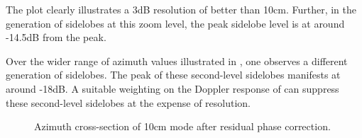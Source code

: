 The plot clearly illustrates a 3dB resolution of better than 10cm. Further, in the generation of sidelobes at this zoom level, the peak sidelobe level is at around -14.5dB from the peak.
\par
Over the wider range of azimuth values illustrated in , one observes a different generation of sidelobes. The peak of these second-level sidelobes manifests at around -18dB. A suitable weighting on the Doppler response of  can suppress these second-level sidelobes at the expense of resolution.
\begin{figure}[ht!]
\begin{center}
 \caption{Azimuth cross-section of 10cm mode after residual phase correction.}
 \label{fg:azimuthCross10wide}
 \end{center}
\end{figure}
